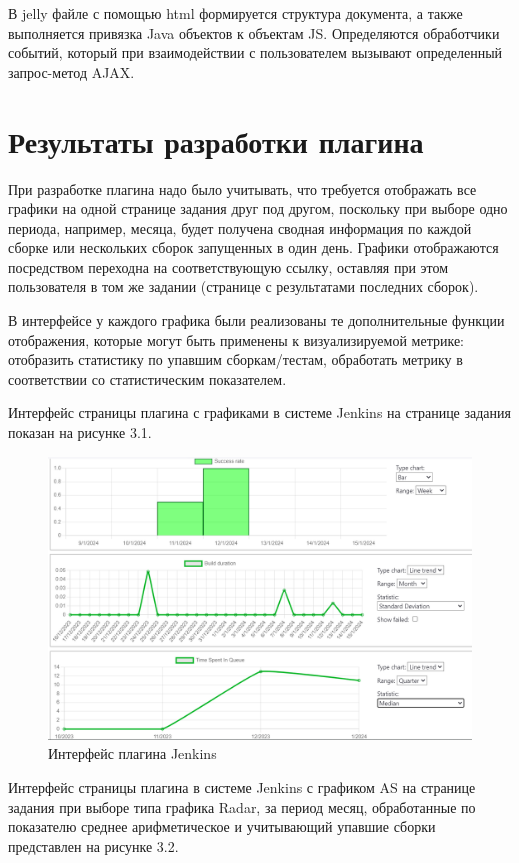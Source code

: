 В jelly файле с помощью html формируется структура документа, а также выполняется привязка Java объектов к объектам JS. Определяются обработчики событий, который при взаимодействии с пользователем вызывают определенный запрос-метод AJAX.

\section{Результаты разработки плагина} \label{ch3:sec2}

При разработке плагина надо было учитывать, что требуется отображать все графики на одной странице задания друг под другом, поскольку при выборе одно периода, например, месяца, будет получена сводная информация по каждой сборке или нескольких сборок запущенных в один день. Графики отображаются посредством переходна на соответствующую ссылку, оставляя при этом пользователя в том же задании (странице с результатами последних сборок).

В интерфейсе у каждого графика были реализованы те дополнительные функции отображения, которые могут быть применены к визуализируемой метрике: отобразить статистику по упавшим сборкам/тестам, обработать метрику в соответствии со статистическим показателем.

Интерфейс страницы плагина с графиками в системе Jenkins на странице задания показан на рисунке 3.1.


\begin{figure}[ht!] 
	\center
	\includegraphics [scale=0.47] {my_folder/images//ui12}
	\caption{Интерфейс плагина Jenkins} 
	\label{fig:ui1}  
\end{figure}

Интерфейс страницы плагина в системе Jenkins с графиком AS на странице задания при выборе типа графика Radar, за период месяц, обработанные по показателю среднее арифметическое и учитывающий упавшие сборки представлен на рисунке 3.2.

